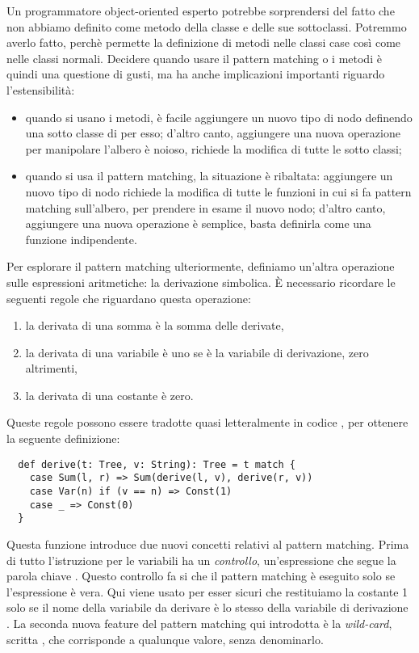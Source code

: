 Un programmatore object-oriented esperto potrebbe sorprendersi del fatto che non abbiamo definito  come metodo della classe  e delle sue sottoclassi. Potremmo averlo fatto, perch\`e \Scala permette la definizione di metodi nelle classi case cos\`i come nelle classi normali. Decidere quando usare il pattern matching o i metodi \`e quindi  una questione di gusti, ma ha anche implicazioni importanti riguardo l'estensibilit\`a:
\begin{itemize}
	\item quando si usano i metodi, \`e facile aggiungere un nuovo tipo di nodo definendo una sotto classe di  per esso; d'altro canto, aggiungere una nuova operazione per manipolare l'albero \`e noioso, richiede la modifica di tutte le sotto classi;
	\item quando si usa il pattern matching, la situazione \`e ribaltata: aggiungere un nuovo tipo di nodo richiede la modifica di tutte le funzioni in cui si fa pattern matching sull'albero, per prendere in esame il nuovo nodo; d'altro canto, aggiungere una nuova operazione \`e semplice, basta definirla come una funzione indipendente.
\end{itemize}
Per esplorare il pattern matching ulteriormente, definiamo un'altra operazione sulle espressioni aritmetiche: la derivazione simbolica. \`E necessario ricordare le seguenti regole che riguardano questa operazione:
\begin{enumerate}
	\item la derivata di una somma \`e la somma delle derivate,
	\item la derivata di una variabile  \`e uno se  \`e la variabile di derivazione, zero altrimenti,
	\item la derivata di una costante \`e zero.
\end{enumerate}
Queste regole possono essere tradotte quasi letteralmente in codice \Scala, per ottenere la seguente definizione:
\begin{lstlisting}
  def derive(t: Tree, v: String): Tree = t match {
    case Sum(l, r) => Sum(derive(l, v), derive(r, v))
    case Var(n) if (v == n) => Const(1)
    case _ => Const(0)
  }
\end{lstlisting}
Questa funzione introduce due nuovi concetti relativi al pattern matching. Prima di tutto l'istruzione  per le variabili ha un \emph{controllo}, un'espressione che segue la parola chiave . Questo controllo fa si che il pattern matching \`e eseguito solo se l'espressione \`e vera. Qui viene usato per esser sicuri che restituiamo la costante 1 solo se il nome della variabile da derivare \`e lo stesso della variabile di derivazione . La seconda nuova feature del pattern matching qui introdotta \`e la \emph{wild-card}, scritta \code{_}, che  corrisponde a qualunque valore, senza denominarlo.

